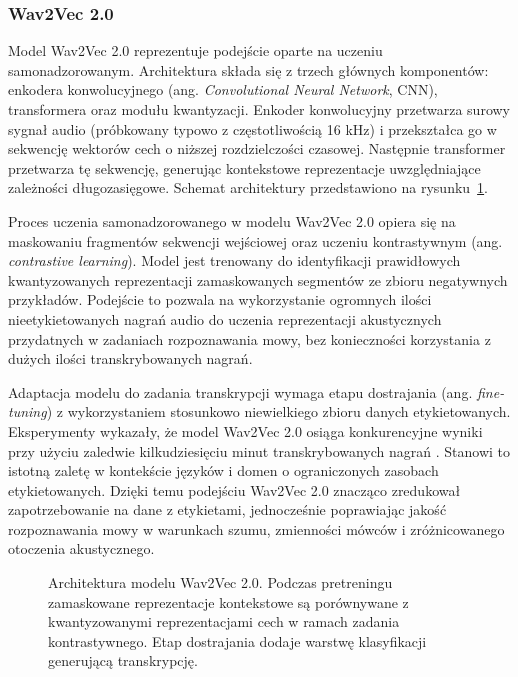 \subsubsection{Wav2Vec 2.0}

Model Wav2Vec 2.0 \cite{baevski2020wav2vec} reprezentuje podejście oparte na uczeniu samonadzorowanym. Architektura składa się z trzech głównych komponentów: enkodera konwolucyjnego (ang. \textit{Convolutional Neural Network}, CNN), transformera oraz modułu kwantyzacji. Enkoder konwolucyjny przetwarza surowy sygnał audio (próbkowany typowo z częstotliwością 16 kHz) i przekształca go w sekwencję wektorów cech o niższej rozdzielczości czasowej. Następnie transformer przetwarza tę sekwencję, generując kontekstowe reprezentacje uwzględniające zależności długozasięgowe. Schemat architektury przedstawiono na rysunku~\ref{fig:wav2vecArchitecture}.

Proces uczenia samonadzorowanego w modelu Wav2Vec 2.0 opiera się na maskowaniu fragmentów sekwencji wejściowej oraz uczeniu kontrastywnym (ang. \textit{contrastive learning}). Model jest trenowany do identyfikacji prawidłowych kwantyzowanych reprezentacji zamaskowanych segmentów ze zbioru negatywnych przykładów. Podejście to pozwala na wykorzystanie ogromnych ilości nieetykietowanych nagrań audio do uczenia reprezentacji akustycznych przydatnych w zadaniach rozpoznawania mowy, bez konieczności korzystania z dużych ilości transkrybowanych nagrań.

Adaptacja modelu do zadania transkrypcji wymaga etapu dostrajania (ang. \textit{fine-tuning}) z wykorzystaniem stosunkowo niewielkiego zbioru danych etykietowanych. Eksperymenty wykazały, że model Wav2Vec 2.0 osiąga konkurencyjne wyniki przy użyciu zaledwie kilkudziesięciu minut transkrybowanych nagrań \cite{baevski2020wav2vec}. Stanowi to istotną zaletę w kontekście języków i domen o ograniczonych zasobach etykietowanych. Dzięki temu podejściu Wav2Vec 2.0 znacząco zredukował zapotrzebowanie na dane z etykietami, jednocześnie poprawiając jakość rozpoznawania mowy w warunkach szumu, zmienności mówców i zróżnicowanego otoczenia akustycznego.

\begin{figure}[htbp]
    \centering
    \caption{Architektura modelu Wav2Vec 2.0. Podczas pretreningu zamaskowane reprezentacje kontekstowe są porównywane z kwantyzowanymi reprezentacjami cech w ramach zadania kontrastywnego. Etap dostrajania dodaje warstwę klasyfikacji generującą transkrypcję.}
    \label{fig:wav2vecArchitecture}
\end{figure}

